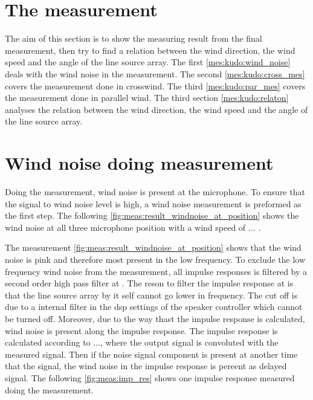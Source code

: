 \section{The measurement}\label{meas:meas_of_kudo}
The aim of this section is to show the measuring result from the final measurement, then try to find a relation between the wind direction, the wind speed and the angle of the line source array. The first \autoref{mes:kudo:wind_noise} deals with the wind noise in the measurement. The second  \autoref{mes:kudo:cross_mes} covers the measurement done in crosswind. The third  \autoref{mes:kudo:par_mes} covers the measurement done in parallel wind. The third section \autoref{mes:kudo:relaton} analyses the relation between the wind direction, the wind speed and the angle of the line source array.


\section{Wind noise doing measurement}\label{mes:kudo:wind_noise}
Doing the measurement, wind noise is present at the microphone. To ensure that the signal to wind noise level is high, a wind noise measurement is preformed as the first step. The following \autoref{fig:meas:result_windnoise_at_position} shows the wind noise at all three microphone position with a wind speed of ... . 




The measurement \autoref{fig:meas:result_windnoise_at_position} shows that the wind noise is pink and therefore most present in the low frequency. To exclude the low frequency wind noise from the measurement, all impulse responses is filtered by a second order high pass filter at . The reson to filter the impulse response at  is that the line source array by it self cannot go lower in frequency. The cut off is due to a internal filter in the \gls{dsp} settings of the speaker controller which cannot be turned off. Moreover, due to the way thast the impulse response is calculated, wind noise is present along the impulse response. The impulse response is calculated according to ..., where the output signal is convoluted with the measured signal. Then if the noise signal component is present at another time that the signal, the wind noise in the impulse response is pereent as delayed signal. The following \autoref{fig:meas:imp_res} shows one impulse response measured doing the measurement.

